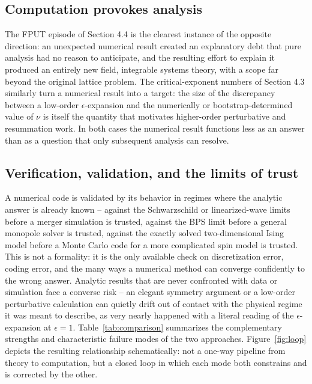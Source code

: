 \subsection{Computation provokes analysis}

The FPUT episode of Section 4.4 is the clearest instance of the opposite
direction: an unexpected numerical result created an explanatory debt that pure
analysis had no reason to anticipate, and the resulting effort to explain it
produced an entirely new field, integrable systems theory, with a scope far
beyond the original lattice problem. The critical-exponent numbers of Section
4.3 similarly turn a numerical result into a target: the size of the
discrepancy between a low-order $\epsilon$-expansion and the numerically or
bootstrap-determined value of $\nu$ is itself the quantity that motivates
higher-order perturbative and resummation work. In both cases the numerical
result functions less as an answer than as a question that only subsequent
analysis can resolve.

\subsection{Verification, validation, and the limits of trust}

A numerical code is validated by its behavior in regimes where the analytic
answer is already known -- against the Schwarzschild or linearized-wave limits
before a merger simulation is trusted, against the BPS limit before a general
monopole solver is trusted, against the exactly solved two-dimensional Ising
model before a Monte Carlo code for a more complicated spin model is trusted.
This is not a formality: it is the only available check on discretization
error, coding error, and the many ways a numerical method can converge
confidently to the wrong answer. Analytic results that are never confronted
with data or simulation face a converse risk -- an elegant symmetry argument or
a low-order perturbative calculation can quietly drift out of contact with the
physical regime it was meant to describe, as very nearly happened with a
literal reading of the $\epsilon$-expansion at $\epsilon=1$.
Table~\ref{tab:comparison} summarizes the complementary strengths and
characteristic failure modes of the two approaches.
Figure~\ref{fig:loop} depicts the resulting relationship schematically: not a
one-way pipeline from theory to computation, but a closed loop in which each
mode both constrains and is corrected by the other.

